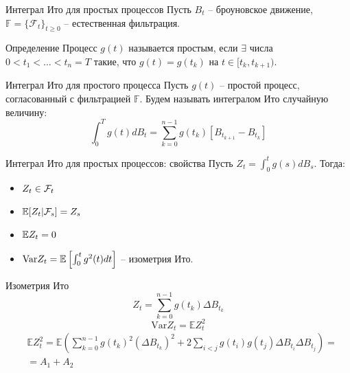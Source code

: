 \documentclass{beamer}
\begin{document}
\begin{frame}{Интеграл Ито для простых процессов}
    Пусть $B_t$ -- броуновское движение, $\mathbb{F}=\{\mathcal{F} _t\}_{t\geq 0}$ -- естественная фильтрация.

    \begin{block}{Определение}
        Процесс $g(t)$ называется простым, если $\exists$ числа $0 < t_1 < \ldots < t_n = T$ такие, что $g(t) = g(t_k)$ на $t \in [t_k, t_{k+1})$.
    \end{block}
     
    
    \begin{block}{Интеграл Ито для простого процесса}
        Пусть $g(t)$ -- простой процесс, согласованный с фильтрацией $\mathbb{F}$. Будем называть интегралом Ито случайную величину:
        $$
            \int_0^T g(t) dB_t = \sum_{k=0}^{n-1} g(t_k)\left[B_{t_{k+1}} - B_{t_k}\right]
        $$
    \end{block}    
\end{frame}

\begin{frame}{Интеграл Ито для простых процессов: свойства}
    Пусть $Z_t = \int_0^t g(s) dB_s$. Тогда:
    \begin{itemize}
        \item $Z_t \in \mathcal{F}_t$
        \item $\mathbb{E} [Z_t | \mathcal{F}_s] = Z_s$
        \item $\mathbb{E} Z_t = 0$
        \item $\mathrm{Var} Z_t = \mathbb{E} \left[ \int_0^t g^2(t) dt \right] $ -- изометрия Ито.
    \end{itemize}
\end{frame}

\begin{frame}{Изометрия Ито}
    $$ Z_t = \sum_{k=0}^{n-1} g(t_k) \Delta B_{t_k}$$
    $$\mathrm{Var} Z_t = \mathbb{E} Z_t^2$$
    \begin{align*}
        &\mathbb{E} Z_t^2 = \mathbb{E} \left(\sum_{k=0}^{n-1} g(t_k)^2 \left(\Delta B_{t_k}\right)^2 + 2 \sum_{i < j} g(t_i)g(t_j) \Delta B_{t_i} \Delta B_{t_j}\right) = \\
        &= A_1 + A_2
    \end{align*}
\end{frame}
\end{document}

